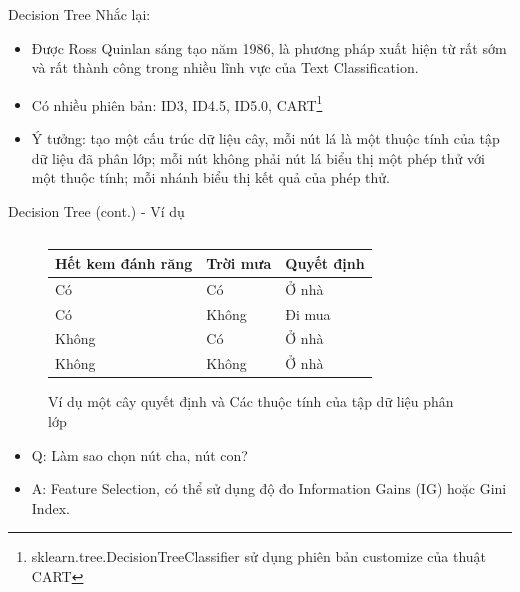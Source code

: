\documentclass[aspectratio=169,xcolor=dvipsnames]{beamer}
\begin{document}
\begin{frame}{Decision Tree}
Nhắc lại:
\begin{itemize}
\item Được Ross Quinlan sáng tạo năm 1986\cite{DBLP:journals/ml/Quinlan86}, là phương pháp xuất hiện từ rất sớm và rất thành công trong nhiều lĩnh vực của Text Classification.
\item Có nhiều phiên bản: ID3, ID4.5, ID5.0, CART\footnote{sklearn.tree.DecisionTreeClassifier sử dụng phiên bản customize của thuật CART\cite{scikit-learn}}
\item Ý tưởng: tạo một cấu trúc dữ liệu cây, mỗi nút lá là một thuộc tính của tập dữ liệu đã phân lớp; mỗi nút không phải nút lá biểu thị một phép thử với một thuộc tính; mỗi nhánh biểu thị kết quả của phép thử.
\end{itemize}
\end{frame}

\begin{frame}{Decision Tree (cont.) - Ví dụ}
\begin{figure}[H]
\begin{columns}[c]
\begin{table}
\begin{tabular}{|l|l|l|}
	\hline
	Hết kem đánh răng & Trời mưa & Quyết định \\
	\hline
	Có & Có & Ở nhà \\
	Có & Không & Đi mua \\
	Không & Có & Ở nhà \\
	Không & Không & Ở nhà \\
	\hline
\end{tabular}
\end{table}
\end{columns}
\caption{Ví dụ một cây quyết định và Các thuộc tính của tập dữ liệu phân lớp}
\end{figure}

\begin{itemize}
	\item Q: Làm sao chọn nút cha, nút con?
	\item A: Feature Selection, có thể sử dụng độ đo Information Gains (IG) hoặc Gini Index.
\end{itemize}
\end{frame}
\end{document}
